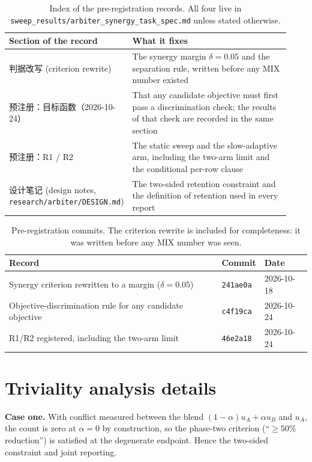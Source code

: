 \documentclass[11pt]{article}
\begin{document}
\begin{table}[h]
\centering
\caption{Index of the pre-registration records. All four live in
\texttt{sweep\_results/arbiter\_synergy\_task\_spec.md} unless stated otherwise.}
\label{tab:prereg-index}
\begin{tabular}{>{\raggedright\arraybackslash}p{0.32\linewidth}>{\raggedright\arraybackslash}p{0.61\linewidth}}
\toprule
Section of the record & What it fixes \\
\midrule
判据改写 (criterion rewrite) & The synergy margin $\delta = 0.05$ and the separation rule,
written before any MIX number existed \\
预注册：目标函数（\mbox{2026-10-24}） & That any candidate objective must first pass a discrimination
check; the results of that check are recorded in the same section \\
预注册：R1 / R2 & The static sweep and the slow-adaptive arm, including the two-arm limit and
the conditional per-row clause \\
设计笔记 (design notes, \texttt{research/arbiter/\allowbreak DESIGN.md}) & The two-sided retention constraint
and the definition of retention used in every report \\
\bottomrule
\end{tabular}
\end{table}

\begin{table}[h]
\centering
\caption{Pre-registration commits. The criterion rewrite is included for completeness: it was
written before any MIX number was seen.}
\begin{tabular}{lll}
\toprule
Record & Commit & Date \\
\midrule
Synergy criterion rewritten to a margin ($\delta = 0.05$) & \texttt{241ae0a} & 2026-10-18 \\
Objective-discrimination rule for any candidate objective & \texttt{c4f19ca} & 2026-10-24 \\
R1/R2 registered, including the two-arm limit & \texttt{46e2a18} & 2026-10-24 \\
\bottomrule
\end{tabular}
\end{table}

\section{Triviality analysis details}\label{app:triviality}

\textbf{Case one.} With conflict measured between the blend $(1-\alpha)u_A + \alpha u_B$ and
$u_A$, the count is zero at $\alpha = 0$ by construction, so the phase-two criterion
(``$\ge 50\%$ reduction'') is satisfied at the degenerate endpoint. Hence the two-sided constraint
and joint reporting.
\end{document}

